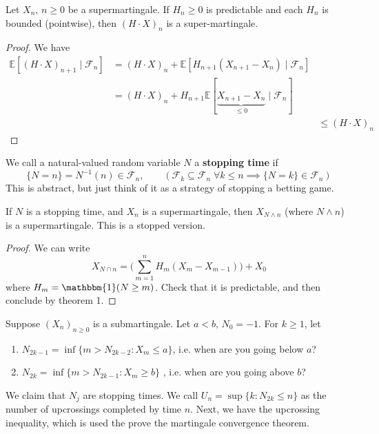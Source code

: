 	\begin{theorem}
		Let $X_n$, $n \geq 0$ be a supermartingale. If $H_n \geq 0$ is predictable and each $H_n$ is bounded (pointwise), then $(H \cdot X)_n$ is a super-martingale. 
	\end{theorem}
	\begin{proof}
	  We have 
		\begin{align}
			\mathbb{E}[(H \cdot X)_{n+1} \mid \mathscr{F}_n] & = (H \cdot X)_n + \mathbb{E}[H_{n+1} (X_{n+1} - X_n) \mid \mathscr{F}_n ] \\ 
																											 & = (H \cdot X)_n + H_{n+1} \mathbb{E}[\underbrace{X_{n+1} - X_n}_{\leq 0} \mid \mathscr{F}_n ] \\ &
																											& \leq (H \cdot X)_n 
		\end{align}
	\end{proof}

	\begin{definition}
	  We call a natural-valued random variable $N$ a \textbf{stopping time} if 
		\begin{equation}
			\{N = n\} = N^{-1} (n) \in \mathscr{F}_n, \qquad ( \mathscr{F}_k \subseteq \mathscr{F}_n \; \forall k \leq n \implies \{N = k\} \in \mathscr{F}_n )
		\end{equation}
		This is abstract, but just think of it as a strategy of stopping a betting game. 
	\end{definition}

	\begin{theorem}
		If $N$ is a stopping time, and $X_n$ is a supermartingale, then $X_{N \wedge n}$ (where $N \wedge n$) is a supermartingale. This is a stopped version. 
	\end{theorem}
	\begin{proof}
	  We can write 
		\begin{equation}
			X_{N \cap n} = \bigg( \sum_{m=1}^n H_m (X_m - X_{m-1}) \bigg) + X_0
		\end{equation}
		where $H_m = \mathbbm{1}(N \geq m)$. Check that it is predictable, and then conclude by theorem 1. 
	\end{proof}

	\begin{example}
		Suppose $(X_n)_{n \geq 0}$ is a submartingale. Let $a < b$, $N_0 = -1$. For $k \geq 1$, let 
		\begin{enumerate}
			\item $N_{2k-1} = \inf\{m > N_{2k-2} \colon X_m \leq a \}$, i.e. when are you going below $a$? 
			\item $N_{2k} = \inf \{m > N_{2k-1} \colon X_m \geq b \}$ , i.e. when are you going above $b$? 
		\end{enumerate}
		We claim that $N_j$ are stopping times. We call $U_n = \sup \{k \colon N_{2k} \leq n\}$ as the number of upcrossings completed by time $n$. Next, we have the upcrossing inequality, which is used the prove the martingale convergence theorem.  
	\end{example}

